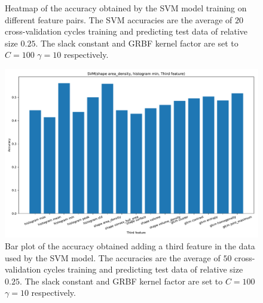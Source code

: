 \begin{figure}[H]
\centering
{}
\caption{Heatmap of the accuracy obtained by the SVM model training on different feature pairs. The SVM accuracies are the average 
of $20$ cross-validation cycles training and predicting test data of relative size $0.25$.
The slack constant and GRBF kernel factor are set to $C=100$  $\gamma=10 $ respectively. }
\label{fig:Figures-feature_pairs1}
\end{figure}

\begin{figure}[H]
\centering
\includegraphics[width=1\textwidth]{Figures/third_feature1}
\caption{Bar plot of the accuracy obtained adding a third feature in the data used 
by the SVM model. The accuracies are the average 
of $50$ cross-validation cycles training and predicting test data of relative size $0.25$.
The slack constant and GRBF kernel factor are set to $C=100$  $\gamma=10 $ respectively. }
\label{fig:Figures-third_feature1}
\end{figure}


